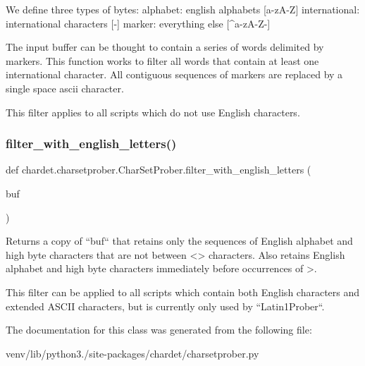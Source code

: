\begin{DoxyVerb}We define three types of bytes:
alphabet: english alphabets [a-zA-Z]
international: international characters [-\xFF]
marker: everything else [^a-zA-Z-\xFF]

The input buffer can be thought to contain a series of words delimited
by markers. This function works to filter all words that contain at
least one international character. All contiguous sequences of markers
are replaced by a single space ascii character.

This filter applies to all scripts which do not use English characters.
\end{DoxyVerb}
 \mbox{\label{classchardet_1_1charsetprober_1_1_char_set_prober_a96f182884544af20f7b45eb1744aaab6}} 
\subsubsection{\texorpdfstring{filter\+\_\+with\+\_\+english\+\_\+letters()}{filter\_with\_english\_letters()}}
{\footnotesize\ttfamily def chardet.\+charsetprober.\+Char\+Set\+Prober.\+filter\+\_\+with\+\_\+english\+\_\+letters (\begin{DoxyParamCaption}\item[{}]{buf }\end{DoxyParamCaption})\hspace{0.3cm}{\ttfamily [static]}}

\begin{DoxyVerb}Returns a copy of ``buf`` that retains only the sequences of English
alphabet and high byte characters that are not between <> characters.
Also retains English alphabet and high byte characters immediately
before occurrences of >.

This filter can be applied to all scripts which contain both English
characters and extended ASCII characters, but is currently only used by
``Latin1Prober``.
\end{DoxyVerb}
 

The documentation for this class was generated from the following file\+:\begin{DoxyCompactItemize}
\item 
venv/lib/python3./site-\/packages/chardet/charsetprober.\+py\end{DoxyCompactItemize}
